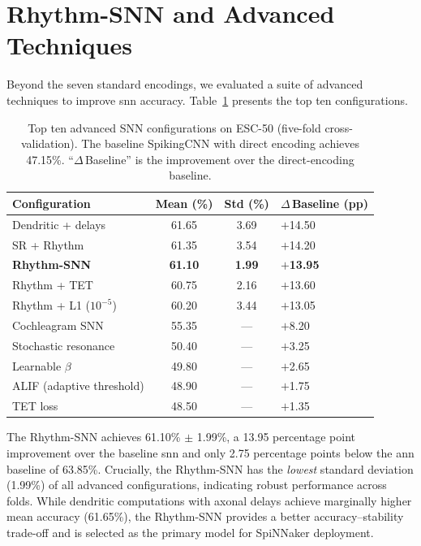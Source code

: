 \section{Rhythm-SNN and Advanced Techniques}
\label{sec:rhythm-results}

Beyond the seven standard encodings, we evaluated a suite of advanced techniques to improve \gls{snn} accuracy. Table~\ref{tab:advanced-techniques} presents the top ten configurations.

\begin{table}[t]
\centering
\caption{Top ten advanced SNN configurations on ESC-50 (five-fold cross-validation). The baseline SpikingCNN with direct encoding achieves 47.15\%. ``$\Delta$\,Baseline'' is the improvement over the direct-encoding baseline.}
\label{tab:advanced-techniques}
\small
\begin{tabular}{@{}lccl@{}}
\toprule
\textbf{Configuration} & \textbf{Mean (\%)} & \textbf{Std (\%)} & \textbf{$\Delta$\,Baseline (pp)} \\
\midrule
Dendritic + delays         & 61.65 & 3.69 & $+$14.50 \\
SR + Rhythm               & 61.35 & 3.54 & $+$14.20 \\
\textbf{Rhythm-SNN}       & \textbf{61.10} & \textbf{1.99} & $+$\textbf{13.95} \\
Rhythm + TET              & 60.75 & 2.16 & $+$13.60 \\
Rhythm + L1 ($10^{-5}$)   & 60.20 & 3.44 & $+$13.05 \\
Cochleagram SNN           & 55.35 & ---  & $+$8.20 \\
Stochastic resonance      & 50.40 & ---  & $+$3.25 \\
Learnable $\beta$         & 49.80 & ---  & $+$2.65 \\
ALIF (adaptive threshold) & 48.90 & ---  & $+$1.75 \\
TET loss                  & 48.50 & ---  & $+$1.35 \\
\bottomrule
\end{tabular}
\end{table}

The Rhythm-SNN achieves 61.10\% $\pm$ 1.99\%, a 13.95 percentage point improvement over the baseline \gls{snn} and only 2.75 percentage points below the \gls{ann} baseline of 63.85\%. Crucially, the Rhythm-SNN has the \emph{lowest} standard deviation (1.99\%) of all advanced configurations, indicating robust performance across folds. While dendritic computations with axonal delays achieve marginally higher mean accuracy (61.65\%), the Rhythm-SNN provides a better accuracy--stability trade-off and is selected as the primary model for SpiNNaker deployment.

